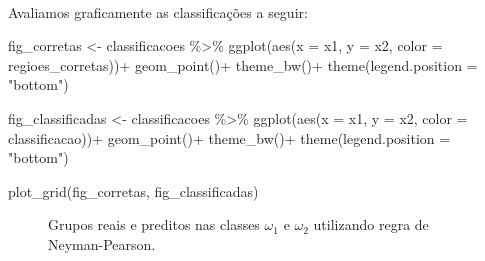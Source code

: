 \documentclass[
  a4paperpaper,
]{article}
\newenvironment{Shaded}{\begin{snugshade}}{\end{snugshade}}
\newcommand{\AttributeTok}[1]{\textcolor[rgb]{0.40,0.45,0.13}{#1}}
\newcommand{\FunctionTok}[1]{\textcolor[rgb]{0.28,0.35,0.67}{#1}}
\newcommand{\NormalTok}[1]{\textcolor[rgb]{0.00,0.23,0.31}{#1}}
\newcommand{\OtherTok}[1]{\textcolor[rgb]{0.00,0.23,0.31}{#1}}
\newcommand{\SpecialCharTok}[1]{\textcolor[rgb]{0.37,0.37,0.37}{#1}}
\newcommand{\StringTok}[1]{\textcolor[rgb]{0.13,0.47,0.30}{#1}}
\begin{document}
~

Avaliamos graficamente as classificações a seguir:

\begin{Shaded}
\begin{Highlighting}[]
\NormalTok{fig\_corretas }\OtherTok{\textless{}{-}}\NormalTok{ classificacoes }\SpecialCharTok{\%\textgreater{}\%}
  \FunctionTok{ggplot}\NormalTok{(}\FunctionTok{aes}\NormalTok{(}\AttributeTok{x =}\NormalTok{ x1, }\AttributeTok{y =}\NormalTok{ x2, }\AttributeTok{color =}\NormalTok{ regioes\_corretas))}\SpecialCharTok{+}
  \FunctionTok{geom\_point}\NormalTok{()}\SpecialCharTok{+}
  \FunctionTok{theme\_bw}\NormalTok{()}\SpecialCharTok{+}
  \FunctionTok{theme}\NormalTok{(}\AttributeTok{legend.position =} \StringTok{"bottom"}\NormalTok{)}

\NormalTok{fig\_classificadas }\OtherTok{\textless{}{-}}\NormalTok{ classificacoes }\SpecialCharTok{\%\textgreater{}\%}
  \FunctionTok{ggplot}\NormalTok{(}\FunctionTok{aes}\NormalTok{(}\AttributeTok{x =}\NormalTok{ x1, }\AttributeTok{y =}\NormalTok{ x2, }\AttributeTok{color =}\NormalTok{ classificacao))}\SpecialCharTok{+}
  \FunctionTok{geom\_point}\NormalTok{()}\SpecialCharTok{+}
  \FunctionTok{theme\_bw}\NormalTok{()}\SpecialCharTok{+}
  \FunctionTok{theme}\NormalTok{(}\AttributeTok{legend.position =} \StringTok{"bottom"}\NormalTok{)}

\FunctionTok{plot\_grid}\NormalTok{(fig\_corretas, fig\_classificadas)}
\end{Highlighting}
\end{Shaded}

\begin{figure}[H]


\caption{\label{fig-classificacoes}Grupos reais e preditos nas classes
\(\omega_1\) e \(\omega_2\) utilizando regra de Neyman-Pearson.}

\end{figure}%
\end{document}
